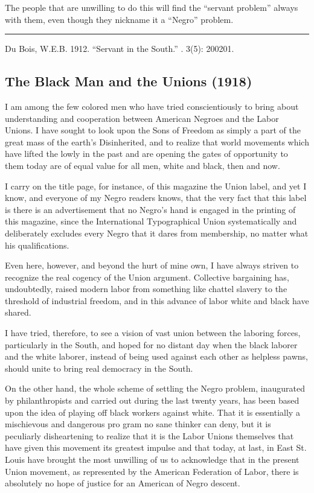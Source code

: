 \documentclass[letterpaper,10pt,english]{jupyterBook}
\begin{document}
\sphinxAtStartPar
The people that are unwilling to do this will find the “servant problem” always with them, even though they nickname it a “Negro” problem.


\bigskip\hrule\bigskip


\sphinxAtStartPar
{} Du Bois, W.E.B. 1912. “Servant in the South.”  . 3(5): 200\sphinxhyphen{}201.


\subsection{The Black Man and the Unions (1918)}
\label{\detokenize{Volumes/15/05/the_black_man_and_the_unions:the-black-man-and-the-unions-1918}}\label{\detokenize{Volumes/15/05/the_black_man_and_the_unions::doc}}
\sphinxAtStartPar
I am among the few colored men who have tried conscientiously to bring about understanding and co\sphinxhyphen{}operation between American Negroes and the Labor Unions. I have sought to look upon the Sons of Freedom as simply a part of the great mass of the earth’s Disinherited, and to realize that world movements which have lifted the lowly in the past and are opening the gates of opportunity to them today are of equal value for all men, white and black, then and now.

\sphinxAtStartPar
I carry on the title page, for instance, of this magazine the Union label, and yet I know, and everyone of my Negro readers knows, that the very fact that this label is there is an advertisement that no Negro’s hand is engaged in the printing of this magazine, since the International Typographical Union systematically and deliberately excludes every Negro that it dares from membership, no matter what his qualifications.

\sphinxAtStartPar
Even here, however, and beyond the hurt of mine own, I have always striven to recognize the real cogency of the Union argument. Collective bargaining has, undoubtedly, raised modern labor from something like chattel slavery to the threshold of industrial freedom, and in this advance of labor white and black have shared.

\sphinxAtStartPar
I have tried, therefore, to see a vision of vast union between the laboring forces, particularly in the South, and hoped for no distant day when the black laborer and the white laborer, instead of being used against each other as helpless pawns, should unite to bring real democracy in the South.

\sphinxAtStartPar
On the other hand, the whole scheme of settling the Negro problem, inaugurated by philanthropists and carried out during the last twenty years, has been based upon the idea of playing off black workers against white. That it is essentially a mischievous and dangerous pro­ gram no sane thinker can deny, but it is peculiarly disheartening to realize that it is the Labor Unions themselves that have given this movement its greatest impulse and that today, at last, in East St. Louis have brought the most unwilling of us to acknowledge that in the present Union movement, as represented by the American Federation of Labor, there is absolutely no hope of justice for an American of Negro descent.
\end{document}
